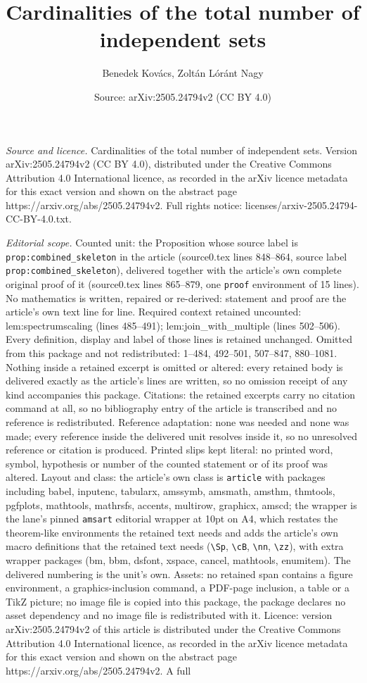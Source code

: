 \documentclass[10pt,a4paper]{amsart}
\title[Cardinalities of the total number of independent sets]{Cardinalities of the total number of independent sets}
\author{Benedek Kov\'acs, Zolt\'an L\'or\'ant Nagy}
\date{Source: arXiv:2505.24794v2 (CC BY 4.0)}
\begin{document}
\maketitle

\noindent\emph{Source and licence.} Cardinalities of the total number of independent sets. Version arXiv:2505.24794v2 (CC BY 4.0), distributed under the Creative Commons Attribution 4.0 International licence, as recorded in the arXiv licence metadata for this exact version and shown on the abstract page https://arxiv.org/abs/2505.24794v2. Full rights notice: licenses/arxiv-2505.24794-CC-BY-4.0.txt.\par\smallskip

\noindent\textit{Editorial scope.} Counted unit: the Proposition whose source label is \texttt{prop:combined\_skeleton} in the article (source0.tex lines 848--864, source label \texttt{prop:combined\_skeleton}), delivered together with the article's own complete original proof of it (source0.tex lines 865--879, one \texttt{proof} environment of 15 lines). No mathematics is written, repaired or re-derived: statement and proof are the article's own text line for line. Required context retained uncounted: lem:spectrumscaling (lines 485--491); lem:join\_with\_multiple (lines 502--506). Every definition, display and label of those lines is retained unchanged. Omitted from this package and not redistributed: 1--484, 492--501, 507--847, 880--1081. Nothing inside a retained excerpt is omitted or altered: every retained body is delivered exactly as the article's lines are written, so no omission receipt of any kind accompanies this package. Citations: the retained excerpts carry no citation command at all, so no bibliography entry of the article is transcribed and no reference is redistributed. Reference adaptation: none was needed and none was made; every reference inside the delivered unit resolves inside it, so no unresolved reference or citation is produced. Printed slips kept literal: no printed word, symbol, hypothesis or number of the counted statement or of its proof was altered. Layout and class: the article's own class is \texttt{article} with packages including babel, inputenc, tabularx, amssymb, amsmath, amsthm, thmtools, pgfplots, mathtools, mathrsfs, accents, multirow, graphicx, amscd; the wrapper is the lane's pinned \texttt{amsart} editorial wrapper at 10pt on A4, which restates the theorem-like environments the retained text needs and adds the article's own macro definitions that the retained text needs (\texttt{\textbackslash Sp}, \texttt{\textbackslash cB}, \texttt{\textbackslash nn}, \texttt{\textbackslash zz}), with extra wrapper packages (bm, bbm, dsfont, xspace, cancel, mathtools, enumitem). The delivered numbering is the unit's own. Assets: no retained span contains a figure environment, a graphics-inclusion command, a PDF-page inclusion, a table or a TikZ picture; no image file is copied into this package, the package declares no asset dependency and no image file is redistributed with it. Licence: version arXiv:2505.24794v2 of this article is distributed under the Creative Commons Attribution 4.0 International licence, as recorded in the arXiv licence metadata for this exact version and shown on the abstract page https://arxiv.org/abs/2505.24794v2. A full 
\end{document}
